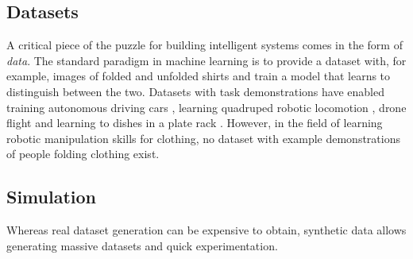 \documentclass[\home/main.tex]{subfiles}
\begin{document}
\subsection{Datasets}
A critical piece of the puzzle for building intelligent systems comes in the form of \emph{data}. The standard paradigm in machine learning is to provide a dataset with, for example, images of folded and unfolded shirts and train a model that learns to distinguish between the two. Datasets with task demonstrations have enabled training autonomous driving cars \autocite{bojarski2016end}, learning quadruped robotic locomotion \autocite{peng2020learning}, drone flight \autocite{Giusti2016} and learning to dishes in a plate rack \autocite{Finn2016}. However, in the field of  learning robotic manipulation skills for clothing, no dataset with example demonstrations of people folding clothing exist. 

\subsection{Simulation}
Whereas real dataset generation can be expensive to obtain, synthetic data allows generating massive datasets and quick experimentation.
\end{document}
